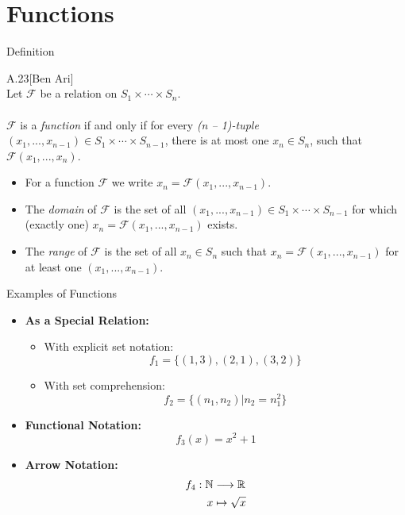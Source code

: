 \documentclass[style=sailor,size=12pt]{powerdot}
\begin{document}
\section[slide=true]{Functions}
\begin{slide}[bm=,toc=]{Definition}
\begin{defn}{A.23}[Ben Ari]
~\\
Let $\mathcal{F}$ be a relation on $S_1 \times \cdots \times S_n$.
\\~\\
$\mathcal{F}$ is a \emph{function} if and only if for every \emph{(n -- 1)-tuple}
$(x_1,...,x_{n-1}) \in S_1 \times \cdots \times S_{n-1}$, there is at most
one $x_n \in S_n$, such that $\mathcal{F}(x_1,...,x_n)$.
\begin{itemize}
\item For a function $\mathcal{F}$ we write $x_n = \mathcal{F}(x_1,...,x_{n-1})$.
\item The \emph{domain} of $\mathcal{F}$ is the set of all
$(x_1,...,x_{n-1})\in S_1 \times \cdots \times S_{n-1}$ for which (exactly one)
$x_n = \mathcal{F}(x_1,...,x_{n-1})$ exists.
\item The \emph{range} of $\mathcal{F}$ is the set of all $x_n \in S_n$ such
that $x_n = \mathcal{F}(x_1,...,x_{n-1})$ for at least one $(x_1,...,x_{n-1})$. 
\end{itemize}
\end{defn}
\end{slide}
\begin{slide}[bm=,toc=]{Examples of Functions}
\begin{itemize}
\item \textbf{As a Special Relation:}
\begin{itemize}
\item With explicit set notation: \[f_1 = \{(1,3),(2,1),(3,2)\}\]
\vspace{-5mm}
\item With set comprehension: \[f_2 = \{(n_1,n_2)|n_2 = n_1^2\}\]
\end{itemize}
\item \textbf{Functional Notation:}
\vspace{-3mm}
\[
  f_3(x) = x^2 + 1
  \]
\vspace{-5mm}
\item \textbf{Arrow Notation:}
\vspace{-3mm}
\begin{align*}
f_4:\mathbb{N} &\longrightarrow \mathbb{R} \\
    x &\mapsto \sqrt{x}
\end{align*}
\end{itemize}

\end{slide}
\end{document}
